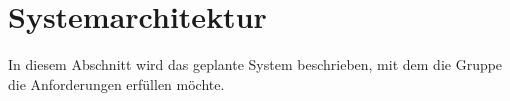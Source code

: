 \section{Systemarchitektur}

In diesem Abschnitt wird das geplante System beschrieben, mit dem die Gruppe die Anforderungen
erfüllen möchte.








